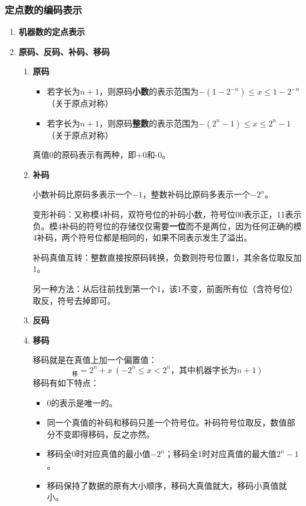\documentclass[12pt, a4paper, oneside]{ctexart}
\begin{document}
\subsubsection{定点数的编码表示}

\begin{enumerate}
  \item {\bf 机器数的定点表示}
  \item {\bf 原码、反码、补码、移码}
  \begin{enumerate}
    \item {\bf 原码}
    
    \begin{itemize}
      \item 若字长为$n+1$，则原码\textbf{小数}的表示范围为$-(1-2^{-n})\leq x\leq 1-2^{-n}$（关于原点对称）
      \item 若字长为$n+1$，则原码\textbf{整数}的表示范围为$-(2^{n}-1)\leq x\leq 2^{n}-1$（关于原点对称）
    \end{itemize}

    真值0的原码表示有两种，即+0和-0。

    \item {\bf 补码}
    
    小数补码比原码多表示一个$-1$，整数补码比原码多表示一个$-2^n$。

    变形补码：又称模4补码，双符号位的补码小数，符号位00表示正，11表示负。模4补码的符号位的存储仅仅需要\textbf{一位}而不是两位，因为任何正确的模4补码，两个符号位都是相同的，如果不同表示发生了溢出。

    补码真值互转：整数直接按原码转换，负数则符号位置1，其余各位取反加1。

    另一种方法：从后往前找到第一个1，该1不变，前面所有位（含符号位）取反，符号去掉即可。

    \item {\bf 反码}
    \item {\bf 移码}
    
    移码就是在真值上加一个偏置值：
    \begin{equation*}
      [x]_{\text{移}}=2^n+x\ (-2^n\leq x< 2^n\text{，其中机器字长为}n+1)
    \end{equation*}
    移码有如下特点：
    \begin{itemize}
      \item 0的表示是唯一的。
      \item 同一个真值的补码和移码只差一个符号位。补码符号位取反，数值部分不变即得移码，反之亦然。
      \item 移码全0时对应真值的最小值$-2^n$；移码全1时对应真值的最大值$2^n-1$。
      \item 移码保持了数据的原有大小顺序，移码大真值就大，移码小真值就小。
    \end{itemize}
  \end{enumerate}
\end{enumerate}
\end{document}

